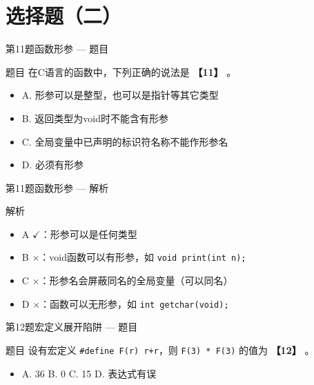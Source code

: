 \section{选择题（二）}

\begin{frame}{第11题}{函数形参 --- 题目}
    \begin{exampleblock}{题目}
        \footnotesize 在C语言的函数中，下列正确的说法是 \textbf{【11】} 。
        \begin{itemize}
            \setlength{\itemsep}{0pt}
            \item A. 形参可以是整型，也可以是指针等其它类型
            \item B. 返回类型为void时不能含有形参
            \item C. 全局变量中已声明的标识符名称不能作形参名
            \item D. 必须有形参
        \end{itemize}
    \end{exampleblock}
\end{frame}

\begin{frame}{第11题}{函数形参 --- 解析}
    \begin{alertblock}{解析}
        \footnotesize
        \begin{itemize}
            \setlength{\itemsep}{0pt}
            \item {\color{highlight}A $\checkmark$：形参可以是任何类型}
            \item B $\times$：void函数可以有形参，如 \texttt{void print(int n);}
            \item C $\times$：形参名会屏蔽同名的全局变量（可以同名）
            \item D $\times$：函数可以无形参，如 \texttt{int getchar(void);}
        \end{itemize}
    \end{alertblock}
\end{frame}

\begin{frame}{第12题}{宏定义展开陷阱 --- 题目}
    \begin{exampleblock}{题目}
        设有宏定义 \texttt{\#define F(r) r+r}，则 \texttt{F(3) * F(3)} 的值为 \textbf{【12】} 。
        \begin{itemize}
            \setlength{\itemsep}{0pt}
            \item A. 36 \quad B. 0 \quad C. 15 \quad D. 表达式有误
        \end{itemize}
    \end{exampleblock}
\end{frame}

